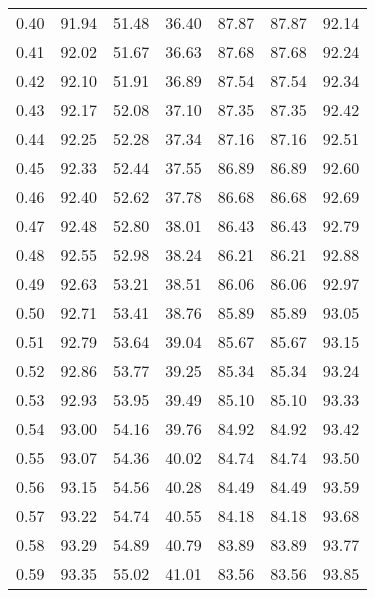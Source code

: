 \begin{tabular}{|c|c|c|c|c|c|c|}
      0.40 &     91.94 &     51.48 &      36.40 &   87.87 &      87.87 &         92.14 \\
      0.41 &     92.02 &     51.67 &      36.63 &   87.68 &      87.68 &         92.24 \\
      0.42 &     92.10 &     51.91 &      36.89 &   87.54 &      87.54 &         92.34 \\
      0.43 &     92.17 &     52.08 &      37.10 &   87.35 &      87.35 &         92.42 \\
      0.44 &     92.25 &     52.28 &      37.34 &   87.16 &      87.16 &         92.51 \\
      0.45 &     92.33 &     52.44 &      37.55 &   86.89 &      86.89 &         92.60 \\
      0.46 &     92.40 &     52.62 &      37.78 &   86.68 &      86.68 &         92.69 \\
      0.47 &     92.48 &     52.80 &      38.01 &   86.43 &      86.43 &         92.79 \\
      0.48 &     92.55 &     52.98 &      38.24 &   86.21 &      86.21 &         92.88 \\
      0.49 &     92.63 &     53.21 &      38.51 &   86.06 &      86.06 &         92.97 \\
      0.50 &     92.71 &     53.41 &      38.76 &   85.89 &      85.89 &         93.05 \\
      0.51 &     92.79 &     53.64 &      39.04 &   85.67 &      85.67 &         93.15 \\
      0.52 &     92.86 &     53.77 &      39.25 &   85.34 &      85.34 &         93.24 \\
      0.53 &     92.93 &     53.95 &      39.49 &   85.10 &      85.10 &         93.33 \\
      0.54 &     93.00 &     54.16 &      39.76 &   84.92 &      84.92 &         93.42 \\
      0.55 &     93.07 &     54.36 &      40.02 &   84.74 &      84.74 &         93.50 \\
      0.56 &     93.15 &     54.56 &      40.28 &   84.49 &      84.49 &         93.59 \\
      0.57 &     93.22 &     54.74 &      40.55 &   84.18 &      84.18 &         93.68 \\
      0.58 &     93.29 &     54.89 &      40.79 &   83.89 &      83.89 &         93.77 \\
      0.59 &     93.35 &     55.02 &      41.01 &   83.56 &      83.56 &         93.85 \\

\end{tabular}
